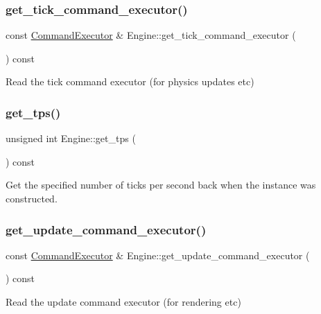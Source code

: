 \subsubsection{\texorpdfstring{get\+\_\+tick\+\_\+command\+\_\+executor()}{get\_tick\_command\_executor()}}
{\footnotesize\ttfamily const \mbox{\hyperlink{class_command_executor}{Command\+Executor}} \& Engine\+::get\+\_\+tick\+\_\+command\+\_\+executor (\begin{DoxyParamCaption}{ }\end{DoxyParamCaption}) const}

Read the tick command executor (for physics updates etc) \mbox{\label{class_engine_afac8cc0ad1a0c97024dc61683588f22c}} 
\subsubsection{\texorpdfstring{get\+\_\+tps()}{get\_tps()}}
{\footnotesize\ttfamily unsigned int Engine\+::get\+\_\+tps (\begin{DoxyParamCaption}{ }\end{DoxyParamCaption}) const}

Get the specified number of ticks per second back when the instance was constructed. \mbox{\label{class_engine_ab53fa08b25bde47cf3fd63956669fc72}} 
\subsubsection{\texorpdfstring{get\+\_\+update\+\_\+command\+\_\+executor()}{get\_update\_command\_executor()}}
{\footnotesize\ttfamily const \mbox{\hyperlink{class_command_executor}{Command\+Executor}} \& Engine\+::get\+\_\+update\+\_\+command\+\_\+executor (\begin{DoxyParamCaption}{ }\end{DoxyParamCaption}) const}

Read the update command executor (for rendering etc) \mbox{\label{class_engine_a30c10f14f67c8f6b0b6d0f47393ea31c}} 
